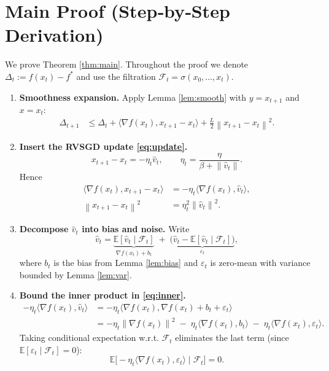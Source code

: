 \documentclass{article}
\newcommand{\E}{\mathbb{E}}
\newcommand{\norm}[1]{\left\lVert#1\right\rVert}
\begin{document}
\section*{Main Proof (Step‑by‑Step Derivation)}
We prove Theorem \ref{thm:main}.  Throughout the proof we denote
$\Delta_t:=f(x_t)-f^{*}$ and use the filtration
$\mathcal{F}_{t}=\sigma(x_0,\dots,x_t)$.

\begin{enumerate}
\item[Step 1.] \textbf{Smoothness expansion.}  
Apply Lemma \ref{lem:smooth} with $y=x_{t+1}$ and $x=x_t$:
\begin{align}
\Delta_{t+1}
&\le \Delta_t
+\big\langle\nabla f(x_t),x_{t+1}-x_t\big\rangle
+\frac{L}{2}\norm{x_{t+1}-x_t}^{2}. \label{eq:smooth}
\end{align}
\item[Step 2.] \textbf{Insert the RVSGD update \eqref{eq:update}.}
\[
x_{t+1}-x_t = -\eta_t\hat v_t,
\qquad
\eta_t=\frac{\eta}{\beta+\norm{\hat v_t}}.
\]
Hence
\begin{align}
\big\langle\nabla f(x_t),x_{t+1}-x_t\big\rangle
&= -\eta_t\big\langle\nabla f(x_t),\hat v_t\big\rangle, \label{eq:inner}\\
\norm{x_{t+1}-x_t}^{2}
&= \eta_t^{2}\norm{\hat v_t}^{2}. \label{eq:norm}
\end{align}
\item[Step 3.] \textbf{Decompose $\hat v_t$ into bias and noise.}
Write
\[
\hat v_t = \underbrace{\E[\hat v_t\mid\mathcal{F}_{t}]}_{\displaystyle \nabla f(x_t)+b_t}
\;+\;
\underbrace{\bigl(\hat v_t-\E[\hat v_t\mid\mathcal{F}_{t}]\bigr)}_{\displaystyle \varepsilon_t},
\]
where $b_t$ is the bias from Lemma \ref{lem:bias} and
$\varepsilon_t$ is zero‑mean with variance bounded by Lemma \ref{lem:var}.
\item[Step 4.] \textbf{Bound the inner product in \eqref{eq:inner}.}
\begin{align}
-\eta_t\big\langle\nabla f(x_t),\hat v_t\big\rangle
&= -\eta_t\big\langle\nabla f(x_t),\nabla f(x_t)+b_t+\varepsilon_t\big\rangle \nonumber\\
&= -\eta_t\norm{\nabla f(x_t)}^{2}
\;-\;\eta_t\big\langle\nabla f(x_t),b_t\big\rangle
\;-\;\eta_t\big\langle\nabla f(x_t),\varepsilon_t\big\rangle. \label{eq:inner2}
\end{align}
Taking conditional expectation w.r.t. $\mathcal{F}_{t}$ eliminates the last term
(since $\E[\varepsilon_t\mid\mathcal{F}_{t}]=0$):
\[
\E\!\bigl[-\eta_t\langle\nabla f(x_t),\varepsilon_t\rangle\mid\mathcal{F}_{t}\bigr]=0.
\]
\end{enumerate}
\end{document}
